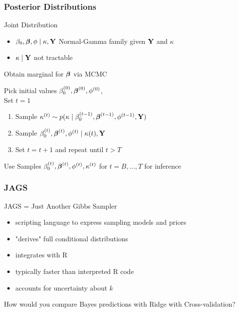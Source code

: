 \documentclass{beamer}\usepackage[]{graphicx}\usepackage[]{color}
\begin{document}
\begin{frame}
  \frametitle{Posterior Distributions}
Joint Distribution
  \begin{itemize}
 \item $\beta_0, \boldsymbol{\beta}, \phi \mid \kappa, \mathbf{Y}$  Normal-Gamma family given $\mathbf{Y}$
   and $\kappa$ \pause
  \item $\kappa \mid \mathbf{Y}$  not tractable \pause
  \end{itemize}
Obtain marginal for  $\boldsymbol{\beta}$ via  MCMC \pause

Pick initial values $\beta_0^{(0)}, \boldsymbol{\beta}^{(0)},
  \phi^{(0)}$, \pause \\

Set  $t = 1$

\begin{enumerate}
 \item Sample $\kappa^{(t)} \sim p(\kappa \mid \beta_0^{(t-1)},
    \boldsymbol{\beta}^{(t-1)}, \phi^{(t-1)}, \mathbf{Y})$ \pause
\item Sample $\beta_0^{(t)}, \boldsymbol{\beta}^{(t)}, \phi^{(t)} \mid \kappa(t),
     \mathbf{Y}$ \pause
\item  Set $t = t + 1$ and repeat until $t > T$ \pause
\end{enumerate}
Use Samples  $\beta_0^{(t)}, \boldsymbol{\beta}^{(t)}, \phi^{(t)}, \kappa^{(t)}$ for $t
= B, \ldots, T$ for inference

\end{frame}

\begin{frame} \frametitle{JAGS}
JAGS = Just Another Gibbs Sampler \pause

\begin{itemize}
\item scripting language to express sampling models and priors \pause
\item "derives" full conditional distributions \pause
\item integrates with R \pause
\item typically faster than interpreted R code \pause
\item accounts for uncertainty about $k$ \pause
\end{itemize}

How would you compare Bayes predictions with Ridge with Cross-validation?
\end{frame}
\end{document}
